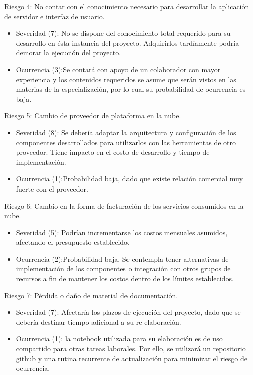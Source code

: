 \documentclass[
11pt, %
]{charter}
\begin{document}
Riesgo 4: No contar con el conocimiento necesario para desarrollar la aplicación de servidor e interfaz de usuario.
\begin{itemize}
	\item Severidad (7): No se dispone del conocimiento total requerido para su desarrollo en ésta instancia del proyecto. Adquirirlos tardíamente podría demorar la ejecución del proyecto.
	\item Ocurrencia (3):Se contará con apoyo de un colaborador con mayor experiencia y los contenidos requeridos se asume que serán vistos en las materias de la especialización, por lo cual su probabilidad de ocurrencia es baja.
\end{itemize}

Riesgo 5: Cambio de proveedor de plataforma en la nube.
\begin{itemize}
	\item Severidad (8): Se debería adaptar la arquitectura y configuración de los componentes desarrollados para utilizarlos con las herramientas de otro proveedor. Tiene impacto en el costo de desarrollo y tiempo de implementación.
	\item Ocurrencia (1):Probabilidad baja, dado que existe relación comercial muy fuerte con el proveedor.
\end{itemize}

Riesgo 6: Cambio en la forma de facturación de los servicios consumidos en la nube.
\begin{itemize}
	\item Severidad (5): Podrían incrementarse los costos mensuales asumidos, afectando el presupuesto establecido.
	\item Ocurrencia (2):Probabilidad baja. Se contempla tener alternativas de implementación de los componentes o integración con otros grupos de recursos a fin de mantener los costos dentro de los límites establecidos.
\end{itemize}


Riesgo 7: Pérdida o daño de material de documentación.
\begin{itemize}
	\item Severidad (7): Afectaría los plazos de ejecución del proyecto, dado que se debería destinar tiempo adicional a su re elaboración.
	\item Ocurrencia (1): la notebook utilizada para su elaboración es de uso compartido para otras tareas laborales. Por ello, se utilizará un repositorio github y una rutina recurrente de actualización para minimizar el riesgo de ocurrencia.
\end{itemize}
\end{document}
